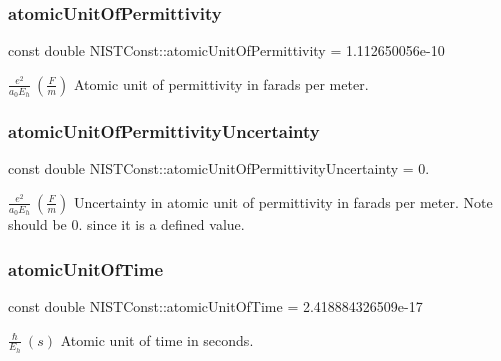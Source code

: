 \subsubsection{\texorpdfstring{atomic\+Unit\+Of\+Permittivity}{atomicUnitOfPermittivity}}
{\footnotesize\ttfamily const double N\+I\+S\+T\+Const\+::atomic\+Unit\+Of\+Permittivity = 1.\+112650056e-\/10}

$\frac{e^2}{a_0 E_h} \ (\frac{F}{m})$ Atomic unit of permittivity in farads per meter. \mbox{\label{group___n_i_s_t_const-_atomic_unit_gaeaf886d76aaf96540bcf9f633fdefd6c}} 
\subsubsection{\texorpdfstring{atomic\+Unit\+Of\+Permittivity\+Uncertainty}{atomicUnitOfPermittivityUncertainty}}
{\footnotesize\ttfamily const double N\+I\+S\+T\+Const\+::atomic\+Unit\+Of\+Permittivity\+Uncertainty = 0.}

$\frac{e^2}{a_0 E_h} \ (\frac{F}{m})$ Uncertainty in atomic unit of permittivity in farads per meter. Note should be 0. since it is a defined value. \mbox{\label{group___n_i_s_t_const-_atomic_unit_ga6181f64b8320afb6ecacc9c7f7e27afa}} 
\subsubsection{\texorpdfstring{atomic\+Unit\+Of\+Time}{atomicUnitOfTime}}
{\footnotesize\ttfamily const double N\+I\+S\+T\+Const\+::atomic\+Unit\+Of\+Time = 2.\+418884326509e-\/17}

$\frac{\hbar}{E_h} \ (s)$ Atomic unit of time in seconds. \mbox{\label{group___n_i_s_t_const-_atomic_unit_ga18e7346fb75798ae9f339c99b3852950}} 
